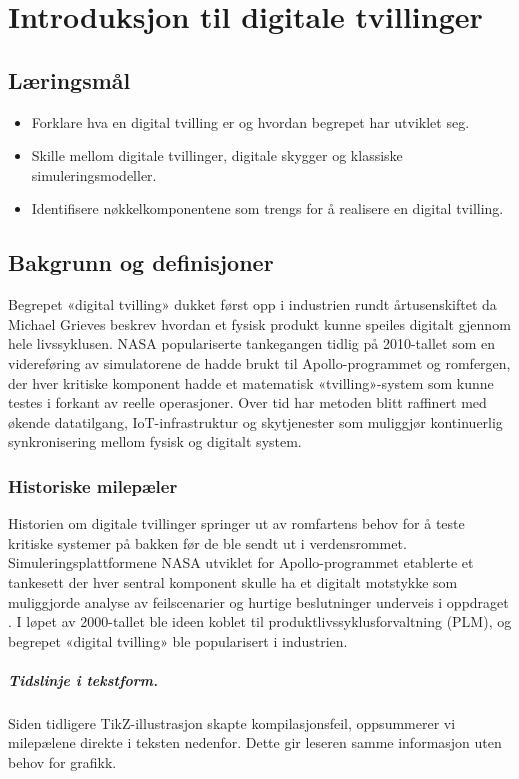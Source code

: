 \chapter{Introduksjon til digitale tvillinger}

\section{Læringsmål}
\begin{itemize}
    \item Forklare hva en digital tvilling er og hvordan begrepet har utviklet seg.
    \item Skille mellom digitale tvillinger, digitale skygger og klassiske simuleringsmodeller.
    \item Identifisere nøkkelkomponentene som trengs for å realisere en digital tvilling.
\end{itemize}

\section{Bakgrunn og definisjoner}
Begrepet «digital tvilling» dukket først opp i industrien rundt årtusenskiftet da Michael Grieves beskrev hvordan et fysisk produkt kunne speiles digitalt gjennom hele livssyklusen. NASA populariserte tankegangen tidlig på 2010-tallet som en videreføring av simulatorene de hadde brukt til Apollo-programmet og romfergen, der hver kritiske komponent hadde et matematisk «tvilling»-system som kunne testes i forkant av reelle operasjoner. Over tid har metoden blitt raffinert med økende datatilgang, IoT-infrastruktur og skytjenester som muliggjør kontinuerlig synkronisering mellom fysisk og digitalt system.

\subsection{Historiske milepæler}
Historien om digitale tvillinger springer ut av romfartens behov for å teste kritiske systemer på bakken før de ble sendt ut i verdensrommet. Simuleringsplattformene NASA utviklet for Apollo-programmet etablerte et tankesett der hver sentral komponent skulle ha et digitalt motstykke som muliggjorde analyse av feilscenarier og hurtige beslutninger underveis i oppdraget \citep{glaessgen2012digital}. I løpet av 2000-tallet ble ideen koblet til produktlivssyklusforvaltning (PLM), og begrepet «digital tvilling» ble popularisert i industrien.

\paragraph{Tidslinje i tekstform.} Siden tidligere TikZ-illustrasjon skapte kompilasjonsfeil, oppsummerer vi milepælene direkte i teksten nedenfor. Dette gir leseren samme informasjon uten behov for grafikk.

